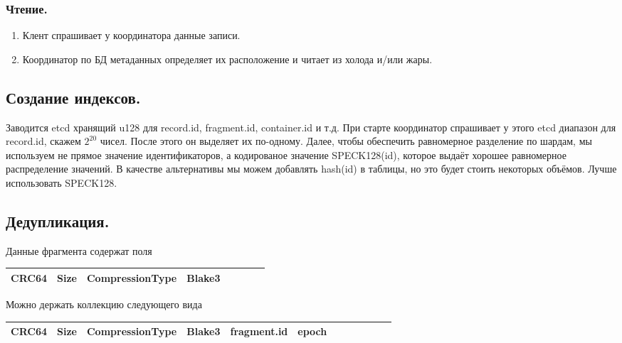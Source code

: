 \documentclass[a4paper,12pt]{article}
\begin{document}
    \subsubsection{Чтение.}

    \begin{enumerate}
        \item Клент спрашивает у координатора данные записи.
        \item Координатор по БД метаданных определяет их расположение и читает из холода и/или жары.
    \end{enumerate}

    \subsection{Создание индексов.}

    Заводится etcd хранящий u128 для record.id, fragment.id, container.id и т.д. При старте координатор спрашивает у этого etcd диапазон для record.id, скажем $2^{20}$ чисел. После этого он выделяет их по-одному.
    Далее, чтобы обеспечить равномерное разделение по шардам, мы используем не прямое значение идентификаторов, а кодированое значение SPECK128(id), которое
    выдаёт хорошее равномерное распределение значений. В качестве альтернативы мы можем добавлять hash(id) в таблицы, но это будет стоить некоторых
    объёмов. Лучше использовать SPECK128.

    \subsection{Дедупликация.}

    Данные фрагмента содержат поля

    \begin{center}
        \begin{tabular}{|Sl|Sc|Sc|Sr|}
            \hline
            CRC64 & Size & CompressionType & Blake3 \\
            \hline
        \end{tabular}
    \end{center}

    \bigskip
    Можно держать коллекцию следующего вида

    \begin{center}
        \begin{tabular}{|Sl|Sc|Sc|Sc|Sc|Sr|}
            \hline
            CRC64 & Size & CompressionType & Blake3 & fragment.id & epoch \\
            \hline
        \end{tabular}
    \end{center}
\end{document}
